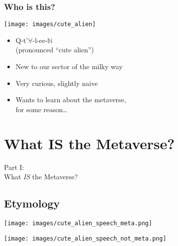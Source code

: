 \documentclass[aspectratio=169,x11names]{beamer}
\begin{document}
\begin{frame}
\frametitle{Who is this?}
\begin{minipage}{0.45\textwidth}
\begin{center}
\texttt{[image: images/cute\_alien]} 
\end{center}
\end{minipage}%
\hfill
\begin{minipage}{0.55\textwidth}
\begin{itemize}
\item Q-t'$\forall$-l-ee-$\mathbb{N}$\\ (pronounced ``cute alien'')
\item New to our sector of the milky way
\item Very curious, slightly naive
\item Wants to learn about the metaverse,\\ for some reason\dots
\end{itemize}
\end{minipage}
\end{frame}

\section{What IS the Metaverse?}

\begin{frame}
\begin{center}
\Large
Part I:\bigskip\\
\huge
What \emph{IS} the Metaverse?
\end{center}
\end{frame}

\subsection{Etymology}

\begin{frame}
\begin{center}
\texttt{[image: images/cute\_alien\_speech\_meta.png]} 
\end{center}
\end{frame}

\begin{frame}
\begin{center}
\texttt{[image: images/cute\_alien\_speech\_not\_meta.png]} 
\end{center}
\end{frame}
\end{document}
